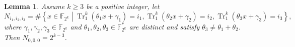 \documentclass{article}
\newcommand{\F}{\mathbb{F}}
\newcommand{\0}{\textbf{0}}
\newcommand{\1}{\textbf{1}}
\newcommand{\TRACE}{\operatorname{Tr}_1^k}
\theoremstyle{plain}
\newtheorem{lemma}{Lemma}
\begin{document}
  \begin{lemma}\label{lemma:N_ijk_trace}
     Assume  $ k\ge 3 $ be a positive integer, 
   let 
   \[ N_{i_1,i_2,i_3}=\#\left\{x\in\F_{2^k}\middle| \TRACE\left(\theta_1x+\gamma_1\right)=i_1,\TRACE\left(\theta_2x+\gamma_2\right)=i_2,\TRACE\left(\theta_3x+\gamma_3\right)=i_3 \right\},\] 
   where  $ \gamma_1,\gamma_2,\gamma_3\in\F_{2^k} $ and $ \theta_1,\theta_2,\theta_3\in\F_{2^k}^* $ are distinct and satisfy 
   $ \theta_3\ne\theta_1+\theta_2 $. Then $ N_{0,0,0}= 2^{k-3} $.
    \end{lemma}
\end{document}
